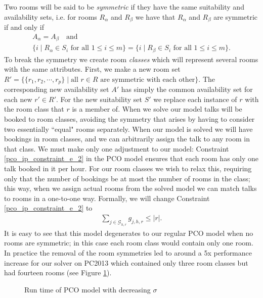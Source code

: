 \documentclass[]{article}
\theoremstyle{definition}
\theoremstyle{remark}
\numberwithin{equation}{section}
\begin{document}
Two rooms will be said to be \emph{symmetric} if they have the same suitability and availability sets, i.e. for rooms $R_\alpha$ and $R_\beta$ we have that $R_\alpha$ and $R_\beta$ are symmetric if and only if
\begin{gather*}
A_\alpha = A_\beta \quad \text{and} \\
\{i \; | \; R_\alpha \in S_i \text{ for all } 1 \le i \le m\} = \{i \; | \; R_\beta \in S_i \text{ for all } 1 \le i \le m\}.
\end{gather*}
To break the symmetry we create room \emph{classes} which will represent several rooms with the same attributes. First, we make a new room set $R' = \{ \{r_1, r_2, \cdots, r_p \} \; | \; \text{all } r \in R \text{ are symmetric with each other} \}$. The corresponding new availability set $A'$ has simply the common availability set for each new $r' \in R'$. For the new suitability set $S'$ we replace each instance of $r$ with the room class that $r$ is a member of. When we solve our model talks will be booked to room classes, avoiding the symmetry that arises by having to consider two essentially ``equal" rooms separately. When our model is solved we will have bookings in room classes, and we can arbitrarily assign the talk to any room in that class. We must make only one adjustment to our model: Constraint \ref{pco_ip_constraint_e_2} in the PCO model ensures that each room has only one talk booked in it per hour. For our room classes we wish to relax this, requiring only that the number of bookings be at most the number of rooms in the class; this way, when we assign actual rooms from the solved model we can match talks to rooms in a one-to-one way. Formally, we will change Constraint \ref{pco_ip_constraint_e_2} to
\begin{gather*}
\sum_{j \in \mathcal G_{h,r}} g_{j,h,r} \le |r|.
\end{gather*}
It is easy to see that this model degenerates to our regular PCO model when no rooms are symmetric; in this case each room class would contain only one room. In practice the removal of the room symmetries led to around a 5x performance increase for our solver on PC2013 which contained only three room classes but had fourteen rooms (see Figure \ref{2013_normal_sigma_run_time}). 
\begin{figure}[h!]
\caption{Run time of PCO model with decreasing $\sigma$}
	\centering
		
	\label{2013_normal_sigma_run_time}
\end{figure}
\end{document}
